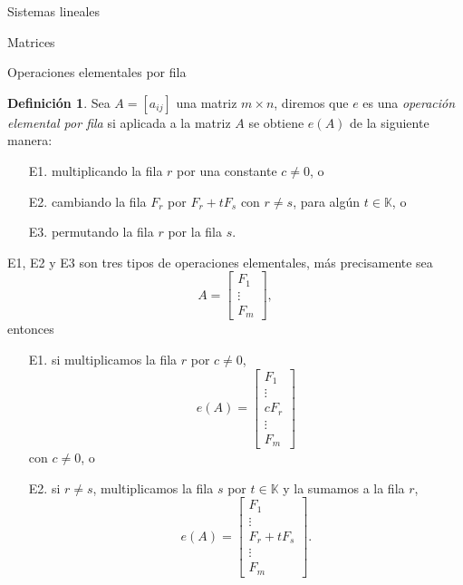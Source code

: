 \documentclass[a4paper,12pt,twoside,spanish,reqno]{amsbook}
\theoremstyle{definition}
\newtheorem{definicion}{Definici\'on}[section]
\theoremstyle{remark}
\newcommand{\K}{\mathbb K}
\begin{document}
\begin{chapter}{Sistemas lineales}
\begin{section}{Matrices}
\begin{subsection}{Operaciones elementales por fila}
                \begin{definicion}
                    Sea $A = [a_{ij}]$ una matriz $m \times  n$, diremos que $e$ es una  \textit{operación elemental por fila} si aplicada a la matriz $A$ se obtiene  $e(A)$ de la siguiente manera:
                    \begin{enumerate}
                        \item[E1.]\label{elem-1} multiplicando la fila $r$ por una constante $c\not=0$, o
                        \item[E2.]\label{elem-2} cambiando la fila $F_r$ por $F_r + tF_s$ con $r\not=s$, para algún $t \in \K$, o
                        \item[E3.]\label{elem-3} permutando la fila $r$ por la fila $s$.   
                    \end{enumerate}
                    E1, E2 y E3 son tres tipos de operaciones elementales, más precisamente sea 
                    \begin{equation*}
                    A = \begin{bmatrix} 
                    F_1 \\  \vdots \\	F_m
                    \end{bmatrix},
                    \end{equation*} entonces 
                    \begin{enumerate}
                        \item[E1.] si multiplicamos la fila $r$ por $c \not=0$, 
                        $$ e(A) = \begin{bmatrix} 
                        F_1 \\ 	\vdots \\ cF_r \\ \vdots \\	F_m
                        \end{bmatrix} $$ con $c \not=0$, o
                        \item[E2.] si $r\not=s$, multiplicamos la fila $s$ por  $t \in \K$ y la sumamos a la fila $r$, 
                        $$ e(A)= \begin{bmatrix} 
                        F_1 \\  \vdots \\ F_r + t F_s\\ \vdots \\	F_m
                        \end{bmatrix}.$$

\end{enumerate}
\end{definicion}
\end{subsection}
\end{section}
\end{chapter}
\end{document}
